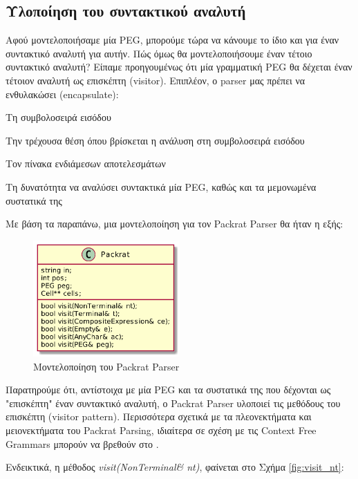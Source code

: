 \subsection{Υλοποίηση του συντακτικού αναλυτή}

Αφού μοντελοποιήσαμε μία PEG, μπορούμε τώρα να κάνουμε το ίδιο και για έναν συντακτικό αναλυτή για αυτήν. 
Πώς όμως θα μοντελοποιήσουμε έναν τέτοιο συντακτικό αναλυτή?
Είπαμε προηγουμένως ότι μία γραμματική PEG θα δέχεται έναν τέτοιον αναλυτή ως επισκέπτη (visitor).
Επιπλέον, ο parser μας πρέπει να ενθυλακώσει (encapsulate):

\begin{description}[font=$\bullet$\scshape\bfseries]
	\item Τη συμβολοσειρά εισόδου
	\item Την τρέχουσα θέση όπου βρίσκεται η ανάλυση στη συμβολοσειρά εισόδου
	\item Τον πίνακα ενδιάμεσων αποτελεσμάτων
	\item Τη δυνατότητα να αναλύσει συντακτικά μία PEG, καθώς και τα μεμονωμένα συστατικά της
\end{description}

Με βάση τα παραπάνω, μια μοντελοποίηση για τον Packrat Parser θα ήταν η εξής:

\begin{figure}[h]
    \centering
	\includegraphics[width=0.50\textwidth]{uml/packrat}
	\caption{Μοντελοποίηση του Packrat Parser}
    \label{fig:packrat_parser}
\end{figure}

\newpage
Παρατηρούμε ότι, αντίστοιχα με μία PEG και τα συστατικά της που δέχονται ως "επισκέπτη" έναν συντακτικό αναλυτή, ο Packrat Parser υλοποιεί τις μεθόδους του επισκέπτη (visitor pattern).
Περισσότερα σχετικά με τα πλεονεκτήματα και μειονεκτήματα του Packrat Parsing, ιδιαίτερα σε σχέση με τις Context Free Grammars μπορούν να βρεθούν στο \cite{Ford2004}.

Ενδεικτικά, η μέθοδος \textit{visit(NonTerminal\& nt)}, φαίνεται στο Σχήμα \ref{fig:visit_nt}:

